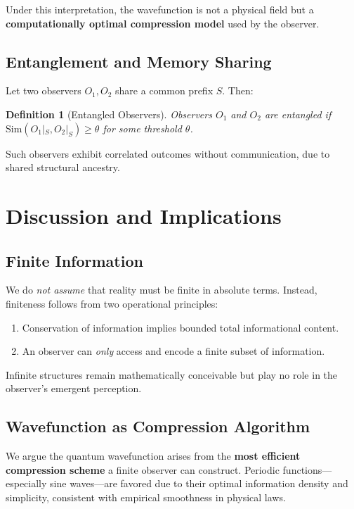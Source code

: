 \documentclass[11pt]{article}
\newtheorem{definition}{Definition}
\begin{document}
Under this interpretation, the wavefunction is not a physical field but a \textbf{computationally optimal compression model} used by the observer.

\subsection{Entanglement and Memory Sharing}

Let two observers \(O_1, O_2\) share a common prefix \(S\). Then:

\begin{definition}[Entangled Observers]
    Observers \(O_1\) and \(O_2\) are entangled if \(\mathrm{Sim}(O_1|_S, O_2|_S)\ge\theta\) for some threshold \(\theta\).
\end{definition}

Such observers exhibit correlated outcomes without communication, due to shared structural ancestry.


\section{Discussion and Implications}

\subsection{Finite Information}

We do \emph{not assume} that reality must be finite in absolute terms. Instead, finiteness follows from two operational principles:
\begin{enumerate}
    \item Conservation of information implies bounded total informational content.
    \item An observer can \emph{only} access and encode a finite subset of information.
\end{enumerate}
Infinite structures remain mathematically conceivable but play no role in the observer’s emergent perception.

\subsection{Wavefunction as Compression Algorithm}

We argue the quantum wavefunction arises from the \textbf{most efficient compression scheme} a finite observer can construct. Periodic functions—especially sine waves—are favored due to their optimal information density and simplicity, consistent with empirical smoothness in physical laws.
\end{document}
